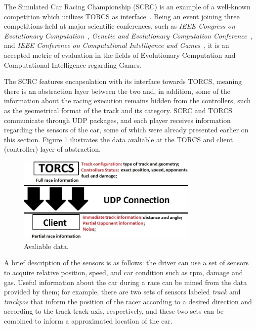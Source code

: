 	The Simulated Car Racing Championship (SCRC) is an example of a well-known competition which utilizes
	TORCS as interface~\cite{SCR}. Being an event joining three competitions held at major scientific conferences, such as
	\emph{IEEE Congress on Evolutionary Computation}~\cite{CEC}, \emph{Genetic and Evolutionary Computation
	Conference}~\cite{GECCO}, and \emph{IEEE Conference on Computational Intelligence and Games}~\cite{CIG}, it is
	an accepted	metric of evaluation in the fields of Evolutionary Computation and Computational Intelligence
	regarding Games.

	The SCRC features encapsulation with its interface towards TORCS, meaning there is an abstraction layer between
	the two and, in addition, some of the information about the racing execution remains hidden from the controllers,
	such as the geometrical format of the track and its category. SCRC and TORCS communicate through UDP packages,
	and each player receives information regarding the sensors of the car, some of which were already presented
	earlier on this section. Figure 1 ilustrates the data avaliable at the TORCS and client (controller) layer
	of abstraction.

	\begin{figure}[h]
	\centering
	\includegraphics[width=250pt]{Figure1}
	\caption{\label{fig:Figure1}Avaliable data.}
	\end{figure}

	A brief description of the sensors is as follows: the driver can use a set of sensors to acquire relative
	position, speed, and car condition such as rpm, damage and gas. Useful information about the car during a
	race can be mined from the data provided by them; for example, there are two sets of sensors labeled
	\emph{track} and \emph{trackpos} that inform the position of the racer according to a desired direction and
	according to the track track axis, respectively, and these two sets can be combined to inform a approximated
	location of the car.

